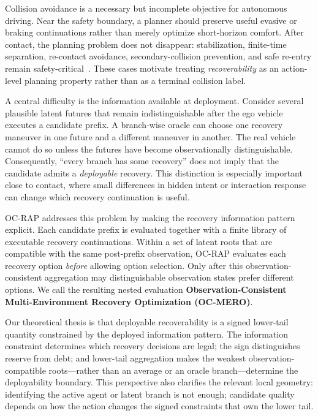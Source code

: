 \documentclass{article} %
\begin{document}
Collision avoidance is a necessary but incomplete objective for autonomous driving. Near the safety boundary, a planner should preserve useful evasive or braking continuations rather than merely optimize short-horizon comfort. After contact, the planning problem does not disappear: stabilization, finite-time separation, re-contact avoidance, secondary-collision prevention, and safe re-entry remain safety-critical~\citep{koopman2024anatomy,wang2023integrated,parseh2023motion,wang2024post,yang2025post,ghosh2026post}. These cases motivate treating \emph{recoverability} as an action-level planning property rather than as a terminal collision label.

A central difficulty is the information available at deployment. Consider several plausible latent futures that remain indistinguishable after the ego vehicle executes a candidate prefix. A branch-wise oracle can choose one recovery maneuver in one future and a different maneuver in another. The real vehicle cannot do so unless the futures have become observationally distinguishable. Consequently, ``every branch has some recovery'' does not imply that the candidate admits a \emph{deployable} recovery. This distinction is especially important close to contact, where small differences in hidden intent or interaction response can change which recovery continuation is useful.

OC-RAP addresses this problem by making the recovery information pattern explicit. Each candidate prefix is evaluated together with a finite library of executable recovery continuations. Within a set of latent roots that are compatible with the same post-prefix observation, OC-RAP evaluates each recovery option \emph{before} allowing option selection. Only after this observation-consistent aggregation may distinguishable observation states prefer different options. We call the resulting nested evaluation \textbf{Observation-Consistent Multi-Environment Recovery Optimization (OC-MERO)}.

Our theoretical thesis is that deployable recoverability is a signed lower-tail quantity constrained by the deployed information pattern. The information constraint determines which recovery decisions are legal; the sign distinguishes reserve from debt; and lower-tail aggregation makes the weakest observation-compatible roots---rather than an average or an oracle branch---determine the deployability boundary. This perspective also clarifies the relevant local geometry: identifying the active agent or latent branch is not enough; candidate quality depends on how the action changes the signed constraints that own the lower tail.
\end{document}

